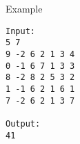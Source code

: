 Example
\begin{verbatim}
Input:
5 7
9 -2 6 2 1 3 4
0 -1 6 7 1 3 3
8 -2 8 2 5 3 2
1 -1 6 2 1 6 1
7 -2 6 2 1 3 7

Output:
41
\end{verbatim}
